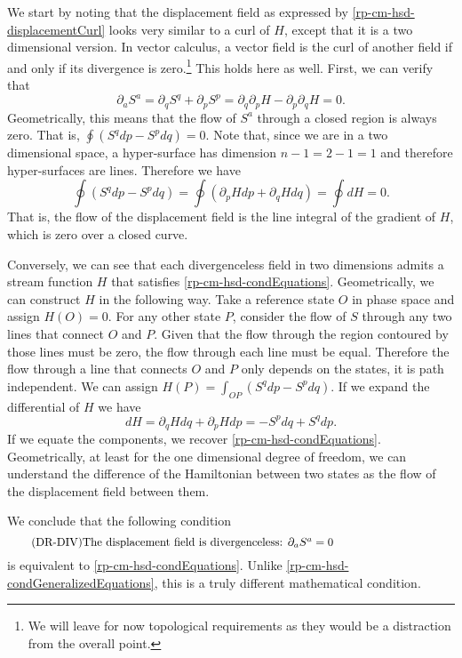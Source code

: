 We start by noting that the displacement field as expressed by \ref{rp-cm-hsd-displacementCurl} looks very similar to a curl of $H$, except that it is a two dimensional version. In vector calculus, a vector field is the curl of another field if and only if its divergence is zero.\footnote{We will leave for now topological requirements as they would be a distraction from the overall point.} This holds here as well. First, we can verify that
\begin{equation}
	\partial_a S^a = \partial_q S^q + \partial_p S^p = \partial_q \partial_p H - \partial_p \partial_q H = 0.
\end{equation}
Geometrically, this means that the flow of $S^a$ through a closed region is always zero. That is, $\oint \left( S^q dp - S^p dq \right) = 0$. Note that, since we are in a two dimensional space, a hyper-surface has dimension $n-1 = 2-1 = 1$ and therefore hyper-surfaces are lines. Therefore we have 
\begin{equation}
	\oint \left( S^q dp - S^p dq \right) = \oint \left( \partial_p H dp + \partial_q H dq \right) = \oint dH = 0.
\end{equation}
That is, the flow of the displacement field is the line integral of the gradient of $H$, which is zero over a closed curve.

Conversely, we can see that each divergenceless field in two dimensions admits a stream function $H$ that satisfies \ref{rp-cm-hsd-condEquations}. Geometrically, we can construct $H$ in the following way. Take a reference state $O$ in phase space and assign $H(O) = 0$. For any other state $P$, consider the flow of $S$ through any two lines that connect $O$ and $P$. Given that the flow through the region contoured by those lines must be zero, the flow through each line must be equal. Therefore the flow through a line that connects $O$ and $P$ only depends on the states, it is path independent. We can assign $H(P) = \int_{OP} \left( S^q dp - S^p dq \right)$. If we expand the differential of $H$ we have
\begin{equation}
	dH = \partial_q H dq + \partial_p H dp = - S^p dq + S^q dp.
\end{equation}
If we equate the components, we recover \ref{rp-cm-hsd-condEquations}. Geometrically, at least for the one dimensional degree of freedom, we can understand the difference of the Hamiltonian between two states as the flow of the displacement field between them.

We conclude that the following condition
\begin{equation}\label{rp-cm-hsd-condDivergenceDisplacement}
	\tag{DR-DIV}
	\eqtext{The displacement field is divergenceless: $\partial_a S^a = 0$} 
\end{equation}
is equivalent to \ref{rp-cm-hsd-condEquations}. Unlike \ref{rp-cm-hsd-condGeneralizedEquations}, this is a truly different mathematical condition.

